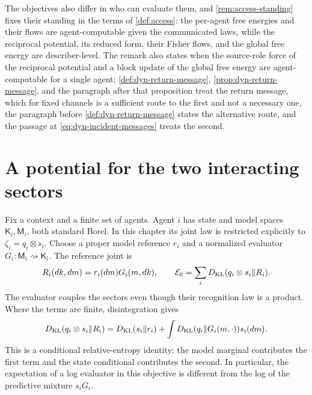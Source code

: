 The objectives also differ in who can evaluate them, and \cref{rem:access-standing} fixes their standing in the terms of \cref{def:access}: the per-agent free energies and their flows are agent-computable given the communicated laws, while the reciprocal potential, its reduced form, their Fisher flows, and the global free energy are describer-level. The remark also states when the source-role force of the reciprocal potential and a block update of the global free energy are agent-computable for a single agent; \cref{def:dyn-return-message}, \cref{prop:dyn-return-message}, and the paragraph after that proposition treat the return message, which for fixed channels is a sufficient route to the first and not a necessary one, the paragraph before \cref{def:dyn-return-message} states the alternative route, and the passage at \cref{eq:dyn-incident-messages} treats the second.

\section{A potential for the two interacting sectors}
\label{sec:dyn-potential}

Fix a context and a finite set of agents. Agent $i$ has state and model spaces $\mathsf K_i,\mathsf M_i$, both standard Borel. In this chapter its joint law is restricted explicitly to $\zeta_i=q_i\otimes s_i$. Choose a proper model reference $r_i$ and a normalized evaluator $G_i:\mathsf M_i\rightsquigarrow\mathsf K_i$. The reference joint is
\begin{equation}
 R_i(dk,dm)=r_i(dm)G_i(m,dk),\qquad
 \mathcal E_0=\sum_iD_{\mathrm{KL}}(q_i\otimes s_i\Vert R_i).
 \label{eq:dyn-local-joint}
\end{equation}
The evaluator couples the sectors even though their recognition law is a product. Where the terms are finite, disintegration gives
\begin{equation}
 D_{\mathrm{KL}}(q_i\otimes s_i\Vert R_i)
 =D_{\mathrm{KL}}(s_i\Vert r_i)+\int D_{\mathrm{KL}}(q_i\Vert G_i(m,\cdot))s_i(dm).
 \label{eq:dyn-local-split}
\end{equation}
This is a conditional relative-entropy identity: the model marginal contributes the first term and the state conditional contributes the second. In particular, the expectation of a log evaluator in this objective is different from the log of the predictive mixture $s_iG_i$.

